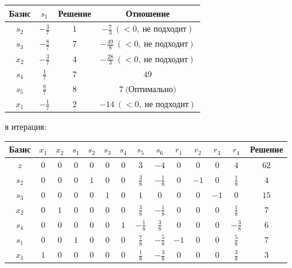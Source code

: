 \documentclass{article}%
\begin{document}
\begin{flushleft}
\newline%
\newline%
\begin{tabular}{|cccc|}%
\hline%
Базис&$s_{1}$&Решение&Отношение\\%
\hline%
$s_{2}$&$-\frac{3}{7}$&$1$&$-\frac{7}{3}\: (< 0, \: \text{не подходит})$\\%
$s_{3}$&$-\frac{8}{7}$&$7$&$-\frac{49}{8}\: (< 0, \: \text{не подходит})$\\%
$x_{2}$&$-\frac{3}{7}$&$4$&$-\frac{28}{3}\: (< 0, \: \text{не подходит})$\\%
$s_{4}$&$\frac{1}{7}$&$7$&$49$\\%
$s_{5}$&$\frac{8}{7}$&$8$&$7\: \text{(Оптимально)}$\\%
$x_{1}$&$-\frac{1}{7}$&$2$&$-14\: (< 0, \: \text{не подходит})$\\%
\hline%
\end{tabular}%
\newline%
\newline%
я итерация: %
\newline%
\newline%
\renewcommand{\arraystretch}{1.3}%
\begin{tabular}{|c|cccccccccccc|c|}%
\hline%
Базис&$x_{1}$&$x_{2}$&$s_{1}$&$s_{2}$&$s_{3}$&$s_{4}$&$s_{5}$&$s_{6}$&$r_{1}$&$r_{2}$&$r_{3}$&$r_{4}$&Решение\\%
\hline%
$z$&$0$&$0$&$0$&$0$&$0$&$0$&$3$&$-4$&$0$&$0$&$0$&$4$&$62$\\%
\hline%
$s_{2}$&$0$&$0$&$0$&$1$&$0$&$0$&$\frac{3}{8}$&$-\frac{1}{8}$&$0$&$-1$&$0$&$\frac{1}{8}$&$4$\\%
$s_{3}$&$0$&$0$&$0$&$0$&$1$&$0$&$1$&$0$&$0$&$0$&$-1$&$0$&$15$\\%
$x_{2}$&$0$&$1$&$0$&$0$&$0$&$0$&$\frac{3}{8}$&$-\frac{1}{8}$&$0$&$0$&$0$&$\frac{1}{8}$&$7$\\%
$s_{4}$&$0$&$0$&$0$&$0$&$0$&$1$&$-\frac{1}{8}$&$\frac{3}{8}$&$0$&$0$&$0$&$-\frac{3}{8}$&$6$\\%
$s_{1}$&$0$&$0$&$1$&$0$&$0$&$0$&$\frac{7}{8}$&$-\frac{5}{8}$&$-1$&$0$&$0$&$\frac{5}{8}$&$7$\\%
$x_{1}$&$1$&$0$&$0$&$0$&$0$&$0$&$\frac{1}{8}$&$-\frac{3}{8}$&$0$&$0$&$0$&$\frac{3}{8}$&$3$\\%
\hline%
\end{tabular}%
\newline%
\newline%
\newline%
\begin{tabular}{|cccc|}%

\end{tabular}
\end{flushleft}
\end{document}
